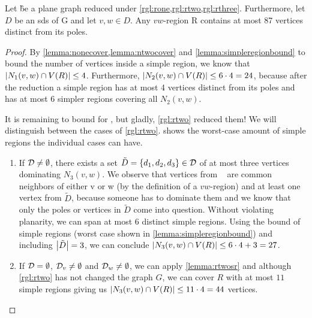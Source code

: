 \begin{lemma}\label{lemma:inside}
    Let \G be a plane graph reduced under \cref{rgl:rone,rgl:rtwo,rgl:rthree}. Furthermore, let $D$ be an sds of G and let $v,w \in D$. Any $vw$-region R contains at most 87 vertices distinct from its poles.
\end{lemma}
\begin{proof} 
    By \cref{lemma:nonecover,lemma:ntwocover} and \cref{lemma:simpleregionbound} to bound the number of vertices inside a simple region, we know that $\abs{N_1(v,w) \cap V(R)} \leq 4$. 
    Furthermore, $\abs{N_2(v,w) \cap V(R)} \leq 6 \cdot 4 = 24$, because after the reduction a simple region has at most 4 vertices distinct from its poles and has at most 6 simpler regions covering all $N_2(v, w)$.
    
    It is remaining to bound for \nthi, but gladly, \cref{rgl:rtwo} reduced them! We will distinguish between the cases of \cref{rgl:rtwo}. 
     shows the worst-case amount of simple regions the individual cases can have.
    
    \begin{caseofz}

        \begin{enumerate}
            \item If $\mathcal{D} \neq \emptyset$, there exists a set $\tilde D = \{d_1,d_2,d_3\} \in \mathcal{D}$ of at most three vertices dominating $N_3(v,w)$. We observe that vertices from \nthi~ are common neighbors of either v or w (by the definition of a $vw$-region) and at least one vertex from $\tilde D$, because someone has to dominate them and we know that only the poles or vertices in $\tilde D$ come into question.
            Without violating planarity, we can span at most 6 distinct simple regions. Using the bound of simple regions (worst case shown in \cref{lemma:simpleregionbound}) and including $\abs{\tilde D} = 3$, we can conclude $\abs{N_3(v,w) \cap V(R)} \leq 6 \cdot 4 + 3 = 27$.
            \item If $\mathcal{D} = \emptyset$, $\mathcal{D}_{v} \neq \emptyset$ and $\mathcal{D}_{w} \neq \emptyset$, we can apply \cref{lemma:rtwosr} and although \cref{rgl:rtwo} has not changed the graph $G$, we can cover $R$ with at most $11$ simple regions giving us $\abs{N_3(v,w) \cap V(R)} \leq 11 \cdot 4 = 44$ vertices.
        \end{enumerate}
        

\end{caseofz}
\end{proof}
